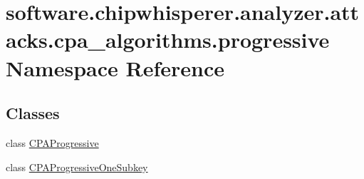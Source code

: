 \hypertarget{namespacesoftware_1_1chipwhisperer_1_1analyzer_1_1attacks_1_1cpa__algorithms_1_1progressive}{}\section{software.\+chipwhisperer.\+analyzer.\+attacks.\+cpa\+\_\+algorithms.\+progressive Namespace Reference}
\label{namespacesoftware_1_1chipwhisperer_1_1analyzer_1_1attacks_1_1cpa__algorithms_1_1progressive}
\subsection*{Classes}
\begin{DoxyCompactItemize}
\item 
class \hyperlink{classsoftware_1_1chipwhisperer_1_1analyzer_1_1attacks_1_1cpa__algorithms_1_1progressive_1_1CPAProgressive}{C\+P\+A\+Progressive}
\item 
class \hyperlink{classsoftware_1_1chipwhisperer_1_1analyzer_1_1attacks_1_1cpa__algorithms_1_1progressive_1_1CPAProgressiveOneSubkey}{C\+P\+A\+Progressive\+One\+Subkey}
\end{DoxyCompactItemize}
